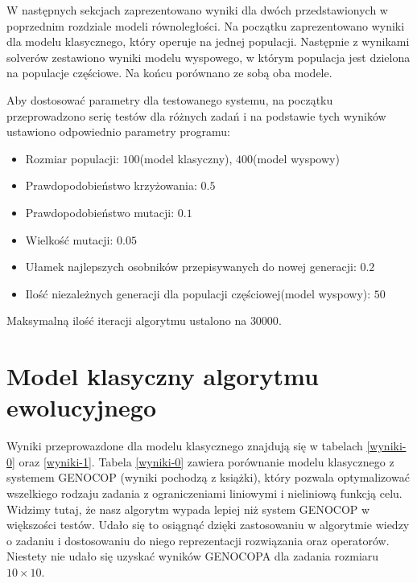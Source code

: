W następnych sekcjach zaprezentowano wyniki dla dwóch przedstawionych w poprzednim rozdziale modeli równoległości. Na początku zaprezentowano wyniki 
dla modelu klasycznego, który operuje na jednej populacji. Następnie z wynikami solverów zestawiono wyniki modelu wyspowego, w którym 
populacja jest dzielona na populacje częściowe. Na końcu porównano ze sobą oba modele.

Aby dostosować parametry dla testowanego systemu, na początku przeprowadzono serię testów dla różnych zadań i na podstawie tych wyników ustawiono 
odpowiednio parametry programu:

\begin{itemize}
    \item Rozmiar populacji: $100$(model klasyczny), $400$(model wyspowy)
    \item Prawdopodobieństwo krzyżowania: $0.5$
    \item Prawdopodobieństwo mutacji: $0.1$
    \item Wielkość mutacji: $0.05$
    \item Ułamek najlepszych osobników przepisywanych do nowej generacji: $0.2$
    \item Ilość niezależnych generacji dla populacji częściowej(model wyspowy): $50$
\end{itemize}

Maksymalną ilość iteracji algorytmu ustalono na $30000$.

\section{Model klasyczny algorytmu ewolucyjnego}

Wyniki przeprowazdone dla modelu klasycznego znajdują się w tabelach \ref{wyniki-0} oraz \ref{wyniki-1}. Tabela \ref{wyniki-0} zawiera porównanie 
modelu klasycznego z systemem GENOCOP (wyniki pochodzą z książki\cite{ALG-GEN-BOOK}), który pozwala optymalizować wszelkiego rodzaju zadania z ograniczeniami liniowymi i nieliniową funkcją celu. 
Widzimy tutaj, że nasz algorytm wypada lepiej niż system GENOCOP w większości testów. Udało się to osiągnąć dzięki zastosowaniu w algorytmie wiedzy o zadaniu
i dostosowaniu do niego reprezentacji rozwiązania oraz operatorów. Niestety nie udało się uzyskać wyników GENOCOPA dla zadania rozmiaru 
$10 \times 10$.

\newpage

